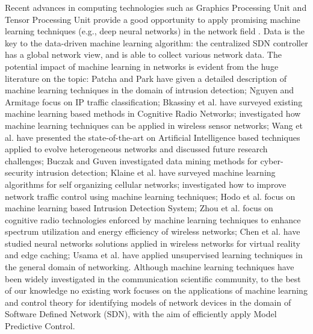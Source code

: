 Recent advances in computing technologies such as Graphics Processing Unit and Tensor Processing Unit provide a good opportunity to apply promising machine learning techniques (e.g., deep neural networks) in the network field \cite{Wang2018, Usama2017}. Data is the key to the data-driven machine learning algorithm: the centralized SDN controller has a global network view, and is able to collect various network data. The potential impact of machine learning in networks is evident from the huge literature on the topic: Patcha and Park \cite{Patcha2007} have given a detailed description of machine learning techniques in the domain of intrusion detection; Nguyen and Armitage \cite{Nguyen2008} focus on IP traffic classification; Bkassiny et al. \cite{Bkassiny2013} have surveyed existing machine learning based methods in Cognitive Radio Networks; \cite{Alsheikh2014} investigated how machine learning techniques can be applied in wireless sensor networks; Wang et al. \cite{Wang2015} have presented the state-of-the-art on Artificial Intelligence based techniques applied to evolve heterogeneous networks and discussed future research challenges; Buczak and Guven \cite{Buczak2016} investigated data mining methods for cyber-security intrusion detection; Klaine et al. \cite{Klaine2017} have surveyed machine learning algorithms for self organizing cellular networks; \cite{Fadlullah2017} investigated how to improve network traffic control using machine learning techniques; Hodo et al. \cite{Hodo2017} focus on machine learning based Intrusion Detection System; Zhou et al. \cite{Zhou2017} focus on cognitive radio technologies enforced by machine learning techniques to enhance spectrum utilization and energy efficiency of wireless networks; Chen et al. \cite{Chen2017} have studied neural networks solutions applied in wireless networks for virtual reality and edge caching; Usama et al. \cite{Usama2017} have applied unsupervised learning techniques in the general domain of networking. Although machine learning techniques have been widely investigated in the communication scientific community, to the best of our knowledge no existing work focuses on the applications of machine learning and control theory for identifying models of network devices in the domain of Software Defined Network (SDN), with the aim of efficiently apply Model Predictive Control.